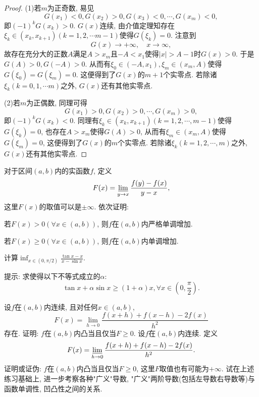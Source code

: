 \begin{quizb}
\begin{proof}
(1)若\(m\)为正奇数, 易见\[G(x_1)<0,G(x_2)>0,G(x_3)<0,\cdots,G(x_m)<0,\]即\((-1)^kG(x_k)>0\). \(G(x)\)连续, 由介值定理知存在\(\xi_k\in(x_k,x_{k+1})(k=1,2,\cdots m-1)\)使得\(G(\xi_k)=0\). 注意到\[G(x)\rightarrow+\infty,\quad x\rightarrow\infty,\]故存在充分大的正数\(A\)满足\(A>x_m\)且\(-A<x_1\)使得\(|x|>A-1\)时\(G(x)> 0\). 于是\(G(A)>0,G(-A)>0\). 从而有\(\xi_0\in(-A,x_1),\xi_m\in(x_m,A)\)使得\(G(\xi_0)=G(\xi_m)=0\). 这便得到了\(G(x)\)的\(m+1\)个实零点. 若除诸\(\xi_k(k=0,1,\cdots m)\)之外, \(G(x)\)还有其他实零点.

(2)若\(m\)为正偶数, 同理可得\[G(x_1)>0,G(x_2)>0,\cdots,G(x_m)>0,\]即\((-1)^{k}G(x_k)<0\). 同理有\(\xi_k\in(x_k,x_{k+1})(k=1,2,\cdots,m-1)\)使得\(G(\xi_k)=0\), 也存在\(A>x_m\)使得\(G(A)>0\), 从而有\(\xi_m\in(x_m,A)\)使得\(G(\xi_m)=0\), 这便得到了\(G(x)\)的\(m\)个实零点. 若除诸\(\xi_k(k=1,2,\cdots,m)\)之外, \(G(x)\)还有其他实零点.
\end{proof}
\woe 对于区间\((a,b)\)内的实函数\(f\), 定义\[F(x)=\varliminf_{y\rightarrow x}\frac{f(y)-f(x)}{y-x},\]这里\(F(x)\)的取值可以是\(\pm\infty\). 依次证明:\begin{quizs}
\item 若\(F(x)>0(\forall x\in(a,b))\), 则\(f\)在\((a,b)\)内严格单调增加.
\item 若\(F(x)\geqslant 0(\forall x\in(a,b))\), 则\(f\)在\((a,b)\)内单调增加.
\end{quizs}
\woe 计算\(\inf_{x\in\left(0,\pi/2\right)}\frac{\tan x-x}{x-\sin x}\).

提示: 求使得以下不等式成立的\(\alpha\):\[\tan x+\alpha\sin x\geqslant (1+\alpha)x,\forall x\in\left(0,\frac{\pi}{2}\right).\]
\begin{solution}

\end{solution}
\woe 设\(f\)在\((a,b)\)内连续, 且对任何\(x\in(a,b)\),\[F(x)=\lim_{h\rightarrow 0}\frac{f(x+h)+f(x-h)-2f(x)}{h^2}\]存在. 证明: \(f\)在\((a,b)\)内凸当且仅当\(F\geqslant 0\).
\woe 设\(f\)在\((a,b)\)内连续. 定义\[F(x)=\varliminf_{h\rightarrow 0}\frac{f(x+h)+f(x-h)-2f(x)}{h^2}.\]证明或证伪: \(f\)在\((a,b)\)内凸当且仅当\(F\geqslant 0\), 这里\(F\)取值也有可能为\(+\infty\).
\woe 试在上述练习基础上, 进一步考察各种"广义"导数, "广义"两阶导数(包括左导数右导数等)与函数单调性, 凹凸性之间的关系.
\end{quizb}
